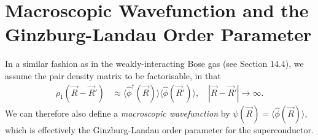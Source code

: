 \documentclass[a4paper, 11pt, normalem]{report}
\begin{document}
\section{Macroscopic Wavefunction and the Ginzburg-Landau Order Parameter}
In a similar fashion as in the weakly-interacting Bose gas (see Section 14.4), we assume the pair density matrix to be factorisable, in that
\begin{align}
    \rho_1(\vec{R}-\vec{R}')&\approx\langle\hat{\phi}^\dagger(\vec{R})\rangle\langle\hat{\phi}(\vec{R}')\rangle,\quad |\vec{R}-\vec{R}'|\to\infty.
\end{align}
We can therefore also define a \emph{macroscopic wavefunction} by $\psi(\vec{R}) = \langle\hat{\phi}(\vec{R})\rangle$, which is effectively the Ginzburg-Landau order parameter for the superconductor.
\end{document}
